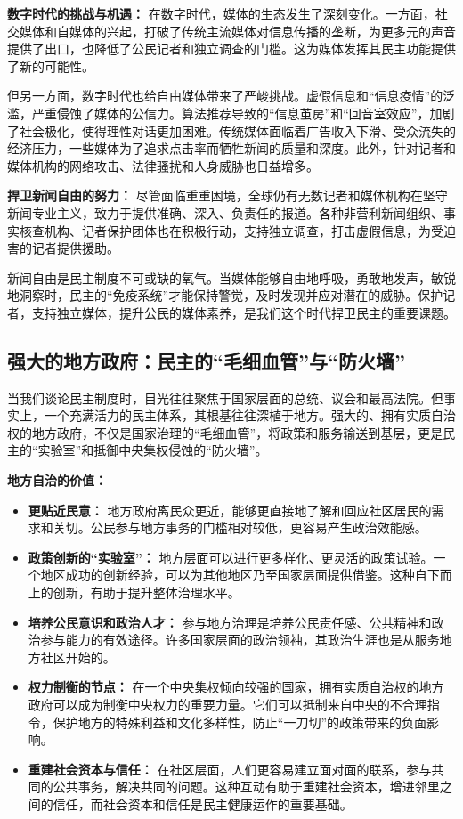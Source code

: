 \documentclass[UTF8, 10pt]{ctexbook}
\begin{document}
\textbf{数字时代的挑战与机遇：} 在数字时代，媒体的生态发生了深刻变化。一方面，社交媒体和自媒体的兴起，打破了传统主流媒体对信息传播的垄断，为更多元的声音提供了出口，也降低了公民记者和独立调查的门槛。这为媒体发挥其民主功能提供了新的可能性。

但另一方面，数字时代也给自由媒体带来了严峻挑战。虚假信息和“信息疫情”的泛滥，严重侵蚀了媒体的公信力。算法推荐导致的“信息茧房”和“回音室效应”，加剧了社会极化，使得理性对话更加困难。传统媒体面临着广告收入下滑、受众流失的经济压力，一些媒体为了追求点击率而牺牲新闻的质量和深度。此外，针对记者和媒体机构的网络攻击、法律骚扰和人身威胁也日益增多。

\textbf{捍卫新闻自由的努力：} 尽管面临重重困境，全球仍有无数记者和媒体机构在坚守新闻专业主义，致力于提供准确、深入、负责任的报道。各种非营利新闻组织、事实核查机构、记者保护团体也在积极行动，支持独立调查，打击虚假信息，为受迫害的记者提供援助。

新闻自由是民主制度不可或缺的氧气。当媒体能够自由地呼吸，勇敢地发声，敏锐地洞察时，民主的“免疫系统”才能保持警觉，及时发现并应对潜在的威胁。保护记者，支持独立媒体，提升公民的媒体素养，是我们这个时代捍卫民主的重要课题。

\subsection{强大的地方政府：民主的“毛细血管”与“防火墙”}
当我们谈论民主制度时，目光往往聚焦于国家层面的总统、议会和最高法院。但事实上，一个充满活力的民主体系，其根基往往深植于地方。强大的、拥有实质自治权的地方政府，不仅是国家治理的“毛细血管”，将政策和服务输送到基层，更是民主的“实验室”和抵御中央集权侵蚀的“防火墙”。

\textbf{地方自治的价值：}
\begin{itemize}
    \item \textbf{更贴近民意：} 地方政府离民众更近，能够更直接地了解和回应社区居民的需求和关切。公民参与地方事务的门槛相对较低，更容易产生政治效能感。
    \item \textbf{政策创新的“实验室”：} 地方层面可以进行更多样化、更灵活的政策试验。一个地区成功的创新经验，可以为其他地区乃至国家层面提供借鉴。这种自下而上的创新，有助于提升整体治理水平。
    \item \textbf{培养公民意识和政治人才：} 参与地方治理是培养公民责任感、公共精神和政治参与能力的有效途径。许多国家层面的政治领袖，其政治生涯也是从服务地方社区开始的。
    \item \textbf{权力制衡的节点：} 在一个中央集权倾向较强的国家，拥有实质自治权的地方政府可以成为制衡中央权力的重要力量。它们可以抵制来自中央的不合理指令，保护地方的特殊利益和文化多样性，防止“一刀切”的政策带来的负面影响。
    \item \textbf{重建社会资本与信任：} 在社区层面，人们更容易建立面对面的联系，参与共同的公共事务，解决共同的问题。这种互动有助于重建社会资本，增进邻里之间的信任，而社会资本和信任是民主健康运作的重要基础。
\end{itemize}
\end{document}
